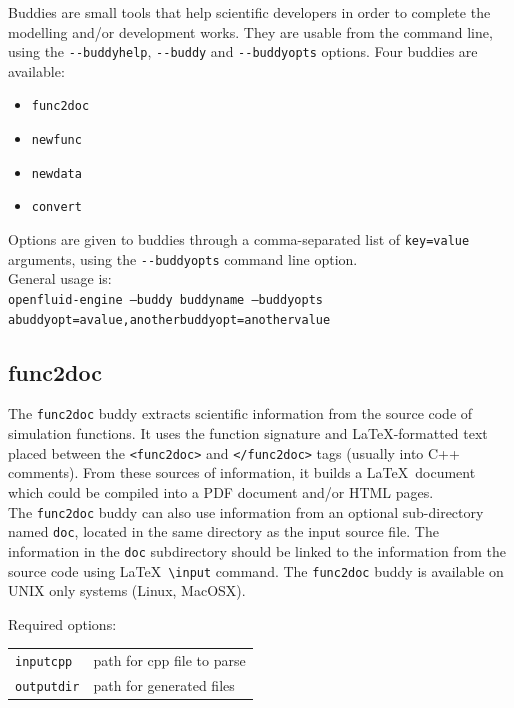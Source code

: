 Buddies are small tools that help scientific developers in order to complete
the modelling and/or development works. They are usable from the command line,
using the \verb?--?\texttt{buddyhelp}, \verb?--?\texttt{buddy} and
\verb?--?\texttt{buddyopts} options. Four buddies are available:
\begin{itemize}
  \item \texttt{func2doc}  
  \item \texttt{newfunc}
  \item \texttt{newdata}
  \item \texttt{convert}
\end{itemize}

\noindent Options are given to buddies through a comma-separated list of \texttt{key=value} arguments, using the \verb?--?\texttt{buddyopts} command line option.\\

\noindent General usage is:\\
\texttt{openfluid-engine --buddy buddyname --buddyopts abuddyopt=avalue,anotherbuddyopt=anothervalue}

\subsection{func2doc}

The \texttt{func2doc} buddy extracts scientific information from the source code
of simulation functions. It uses the function signature and \LaTeX-formatted text
placed between the \texttt{<func2doc>} and \texttt{</func2doc>} tags (usually
into C++ comments). From these sources of information, it builds a \LaTeX\
document which could be compiled into a PDF document and/or HTML pages.\\
The \texttt{func2doc} buddy can also use information from an optional
sub-directory named \texttt{doc}, located in the same directory as the input source file. The
information in the \texttt{doc} subdirectory should be linked to the information
from the source code using \LaTeX\ \texttt{\textbackslash input} command. The
\texttt{func2doc} buddy is available on UNIX only systems (Linux, MacOSX).

\bigskip

\noindent Required options:
\begin{center}
\begin{tabularx}{\linewidth}{lX}
\texttt{inputcpp}&path for cpp file to parse\\
\texttt{outputdir}&path for generated files\\
\end{tabularx}
\end{center}


